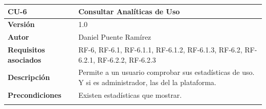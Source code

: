 \begin{longtable}[H]{@{}ll@{}}
\toprule
\begin{minipage}[b]{0.23\columnwidth}\raggedright\strut
\textbf{CU-6}\strut
\end{minipage} & \begin{minipage}[b]{0.71\columnwidth}\raggedright\strut
\textbf{Consultar Analíticas de Uso}\strut
\end{minipage}\tabularnewline
\midrule
\endhead
\begin{minipage}[t]{0.23\columnwidth}\raggedright\strut
\textbf{Versión}\strut
\end{minipage} & \begin{minipage}[t]{0.71\columnwidth}\raggedright\strut
1.0\strut
\end{minipage}\tabularnewline
\begin{minipage}[t]{0.23\columnwidth}\raggedright\strut
\textbf{Autor}\strut
\end{minipage} & \begin{minipage}[t]{0.71\columnwidth}\raggedright\strut
Daniel Puente Ramírez\strut
\end{minipage}\tabularnewline
\begin{minipage}[t]{0.23\columnwidth}\raggedright\strut
\textbf{Requisitos asociados}\strut
\end{minipage} & \begin{minipage}[t]{0.71\columnwidth}\raggedright\strut
RF-6, RF-6.1, RF-6.1.1, RF-6.1.2, RF-6.1.3, RF-6.2, RF-6.2.1, RF-6.2.2, RF-6.2.3\strut
\end{minipage}\tabularnewline
\begin{minipage}[t]{0.23\columnwidth}\raggedright\strut
\textbf{Descripción}\strut
\end{minipage} & \begin{minipage}[t]{0.71\columnwidth}\raggedright\strut
Permite a un usuario comprobar sus estadísticas de uso. Y si es administrador, las del la plataforma.\strut
\end{minipage}\tabularnewline
\begin{minipage}[t]{0.23\columnwidth}\raggedright\strut
\textbf{Precondiciones}\strut
\end{minipage} & \begin{minipage}[t]{0.71\columnwidth}\raggedright\strut
Existen estadísticas que mostrar.\strut
\end{minipage}\tabularnewline
\begin{minipage}[t]{0.23\columnwidth}\raggedright\strut

\end{minipage}
\end{longtable}
